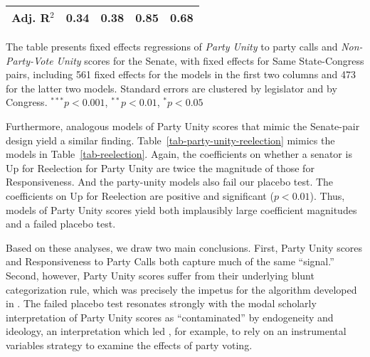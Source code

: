 \documentclass[12pt]{article}
\begin{document}
\begin{table}[!htbp]
\begin{threeparttable}
\begin{tabular}{l c c c c }
Adj. R$^2$%
                                  & 0.34          & 0.38       & 0.85          & 0.68          \\
\hline
\end{tabular}
\begin{tablenotes}
   \item
   The table presents fixed effects regressions of \textit{Party Unity} to party calls and \textit {Non-Party-Vote Unity} scores for the Senate, with fixed effects for Same State-Congress pairs, including 561 fixed effects for the models in the first two columns and 473 for the latter two models.  Standard errors are clustered by legislator and by Congress.
   $^{***}p<0.001$, $^{**}p<0.01$, $^*p<0.05$
 \end{tablenotes}
\end{threeparttable}
\end{table}

Furthermore, analogous models of Party Unity scores that mimic the Senate-pair
design yield a similar finding.
Table~\ref{tab-party-unity-reelection} mimics the models in
Table~\ref{tab-reelection}.
Again, the coefficients on whether a senator is Up for Reelection for
Party Unity are twice the
magnitude of those for Responsiveness.
And the party-unity models also fail our placebo test.
The coefficients on Up for Reelection are positive and significant
($p < 0.01$).
Thus, models of Party Unity scores yield both implausibly large coefficient
magnitudes and a failed placebo test.

Based on these analyses, we draw two main conclusions.
First, Party Unity scores and Responsiveness to Party Calls both capture much of
the same ``signal.''
Second, however, Party Unity scores suffer from their underlying blunt
categorization rule, which was precisely the impetus for the algorithm
developed in \cite{Minozzi:2013}. The failed placebo test resonates strongly with the modal scholarly interpretation of
Party Unity scores as ``contaminated'' by endogeneity and ideology,
an interpretation which led \cite{Carson:2010}, for example, to rely on an
instrumental variables strategy to examine the effects of party voting.

\clearpage

\singlespacing


\end{document}
